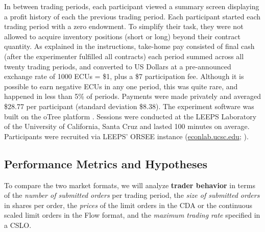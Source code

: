 \documentclass[12pt]{article}
\begin{document}
In between trading periods, each participant viewed a summary screen displaying a profit history of each the previous trading period.
Each participant started each trading period with a zero endowment. 
To simplify their task, they were not allowed to acquire inventory positions 
(short or long) beyond their contract quantity.
As explained in the instructions,
take-home pay consisted of final cash
(after the experimenter fulfilled all contracts) each period summed across all twenty trading periods, and converted to US Dollars at a pre-announced exchange rate of 1000 ECUs = \$1, plus a \$7 participation fee. 
Although it is possible to earn negative ECUs in any one period, this was quite rare, and happened in less than 5\% of periods. 
Payments were made privately and averaged \$28.77 per participant %
(standard deviation \$8.38).
The experiment software was built on the oTree platform \citep{otree}. Sessions were conducted at the LEEPS Laboratory of the University of California, Santa Cruz and lasted 100 minutes on average. Participants were recruited via LEEPS' ORSEE instance (\hyperlink{https://econlab.ucsc.edu/public/}{econlab.ucsc.edu}; \cite{Greiner2015}).



\subsection{Performance Metrics and Hypotheses}\label{sect:metricHyps}
\label{sec:hypotheses}

To compare the two market formats, we will analyze \textbf{trader behavior} in terms of 
the \textit{number of submitted orders} per trading period, 
the \textit{size of submitted orders}  in shares per order,
the \textit{prices} of the limit orders in the CDA or the continuous scaled limit orders in the Flow format, and
the \textit{maximum trading rate} specified in a CSLO.
\end{document}
